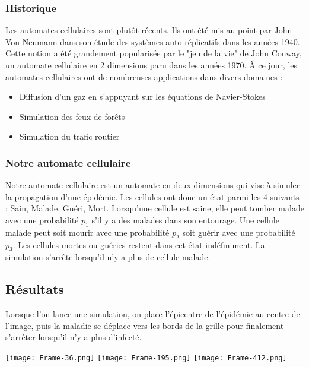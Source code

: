 \documentclass{article}
\begin{document}
\subsubsection{Historique}
	Les automates cellulaires sont plutôt récents. Ils ont été mis au point par John Von Neumann dans son étude des systèmes auto-réplicatifs dans les années 1940. Cette notion a été grandement popularisée par le "jeu de la vie" de John Conway, un automate cellulaire en 2 dimensions paru dans les années 1970. À ce jour, les automates cellulaires ont de nombreuses applications dans divers domaines :
	\begin{itemize}
	\item Diffusion d'un gaz en s'appuyant sur les équations de Navier-Stokes
	\item Simulation des feux de forêts
	\item Simulation du trafic routier
	\end{itemize}

\subsubsection{Notre automate cellulaire}
	Notre automate cellulaire est un automate en deux dimensions qui vise à simuler la propagation d'une épidémie. Les cellules ont donc un état parmi les 4 suivants : Sain, Malade, Guéri, Mort. Lorsqu'une cellule est saine, elle peut tomber malade avec une probabilité $p_1$ s'il y a des malades dans son entourage. Une cellule malade peut soit mourir avec une probabilité $p_2$ soit guérir avec une probabilité $p_3$. Les cellules mortes ou guéries restent dans cet état indéfiniment. La simulation s'arrête lorsqu'il n'y a plus de cellule malade.


\subsection{Résultats}

Lorsque l'on lance une simulation, on place l'épicentre de l'épidémie au centre de l'image, puis la maladie se déplace vers les bords de la grille pour finalement s'arrêter lorsqu'il n'y a plus d'infecté.

	\texttt{[image: Frame-36.png]}
	\texttt{[image: Frame-195.png]} 
	\texttt{[image: Frame-412.png]} 
\end{document}
